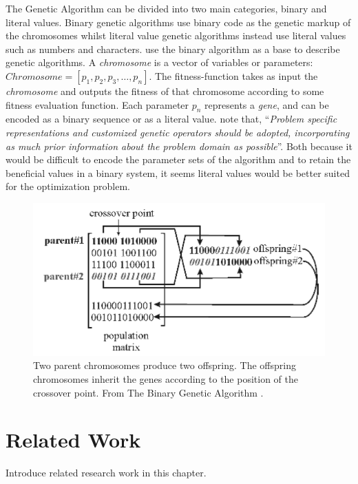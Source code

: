 The Genetic Algorithm can be divided into two main categories, binary and literal values. Binary genetic algorithms use binary code as the genetic markup of the chromosomes whilst literal value genetic algorithms instead use literal values such as numbers and characters. \citeauthor{Haupt2004a} use the binary algorithm as a base to describe genetic algorithms. A \textit{chromosome} is a vector of variables or parameters: \(Chromosome = [p_{1},p_{2},p_{3},\dots,p_{n}]\). The fitness-function takes as input the \textit{chromosome} and outputs the fitness of that chromosome according to some fitness evaluation function. Each parameter \(p_{n}\) represents a \textit{gene}, and can be encoded as a binary sequence or as a literal value. \citeauthor[p. 93]{Brownlee2011} note that, ``\textit{Problem specific representations and customized genetic operators should be adopted, incorporating as much prior information about the problem domain as possible}''. Both because it would be difficult to encode the parameter sets of the \CTC algorithm and to retain the beneficial values in a binary system, it seems literal values would be better suited for the optimization problem.

\begin{figure}[!h]
  \begin{center}
    \includegraphics[totalheight=0.175\textheight]{figures/crossover}
  \end{center}
  \caption{Two parent chromosomes produce two offspring. The offspring chromosomes inherit the genes according to the position of the crossover point. From The Binary Genetic Algorithm \protect \cite[p. 42]{Haupt2004a}.}
  \label{crossover}
\end{figure}

\section{Related Work}
\label{RelatedWork}
Introduce related research work in this chapter.
